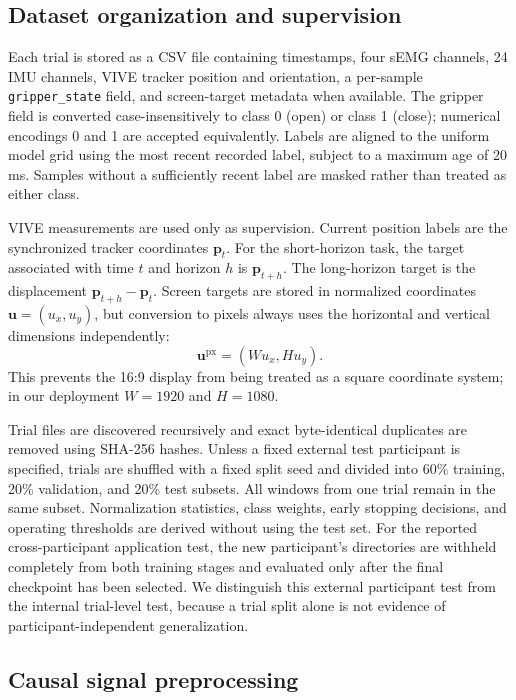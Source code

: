 \subsection{Dataset organization and supervision}

Each trial is stored as a CSV file containing timestamps, four sEMG channels,
24 IMU channels, VIVE tracker position and orientation, a per-sample
\texttt{gripper\_state} field, and screen-target metadata when available.  The
gripper field is converted case-insensitively to class 0 (open) or class 1
(close); numerical encodings 0 and 1 are accepted equivalently.  Labels are
aligned to the uniform model grid using the most recent recorded label, subject
to a maximum age of 20 ms.  Samples without a sufficiently recent label are
masked rather than treated as either class.

VIVE measurements are used only as supervision.  Current position labels are
the synchronized tracker coordinates $\mathbf{p}_t$.  For the short-horizon
task, the target associated with time $t$ and horizon $h$ is
$\mathbf{p}_{t+h}$.  The long-horizon target is the displacement
$\mathbf{p}_{t+h}-\mathbf{p}_t$.  Screen targets are stored in normalized
coordinates $\mathbf{u}=(u_x,u_y)$, but conversion to pixels always uses the
horizontal and vertical dimensions independently:
\begin{equation}
    \mathbf{u}^{\mathrm{px}}
    = \left(Wu_x,Hu_y\right).
\end{equation}
This prevents the 16:9 display from being treated as a square coordinate
system; in our deployment $W=1920$ and $H=1080$.

Trial files are discovered recursively and exact byte-identical duplicates are
removed using SHA-256 hashes.  Unless a fixed external test participant is
specified, trials are shuffled with a fixed split seed and divided into 60\%
training, 20\% validation, and 20\% test subsets.  All windows from one trial
remain in the same subset.  Normalization statistics, class weights, early
stopping decisions, and operating thresholds are derived without using the test
set.  For the reported cross-participant application test, the new
participant's directories are withheld completely from both training stages
and evaluated only after the final checkpoint has been selected.  We
distinguish this external participant test from the internal trial-level test,
because a trial split alone is not evidence of participant-independent
generalization.

\subsection{Causal signal preprocessing}
\label{subsec:preprocessing}

